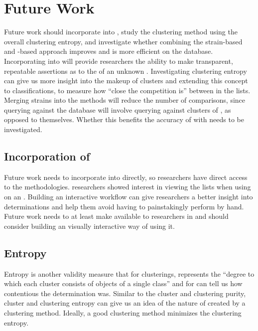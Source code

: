 \section{Future Work}
Future work should incorporate \krap{} into \cplop{}, study the \dbscan{} clustering method using the overall clustering entropy, and investigate whether combining the strain-based and \isol{}-based approach improves \mst{} and is more efficient on the \cplop{} database.
Incorporating \krap{} into \cplop{} will provide researchers the ability to make transparent, repeatable assertions as to the \spec{} of an unknown \isol{}.
Investigating clustering entropy can give us more insight into the makeup of clusters and extending this concept to \krap{} classifications, to measure how ``close the competition is'' between \spec{} in the \knnlong{} lists.
Merging strains into the \krap{} methods will reduce the number of comparisons, since querying against the database will involve querying against clusters of \isols{}, as opposed to \isols{} themselves.
Whether this benefits the accuracy of \mst{} with \cplop{} needs to be investigated.

\subsection{\cplop{} Incorporation of \krap{}}
Future work needs to incorporate \krap{} into \cplop{} directly, so \cp{} researchers have direct access to the \mst{} methodologies.
\cplop{} researchers showed interest in viewing the \knnlong{} lists when using \krap{} on an \isol{}.
Building an interactive \mst{} workflow can give researchers a better insight into \spec{} determinations and help them avoid having to painstakingly perform \mst{} by hand.
Future work needs to at least make \krap{} available to researchers in \cplop{} and should consider building an visually interactive way of using it.

\subsection{Entropy}
Entropy  is another validity measure that for clusterings, represents the ``degree to which each cluster consists of objects of a single class'' \cite{tan2006introduction} and for \krap{} can tell us how contentious the \spec{} determination was.
Similar to the cluster and clustering purity, cluster and clustering entropy can give us an idea of the nature of \bslongs{} created by a clustering method.
Ideally, a good clustering method minimizes the clustering entropy.

